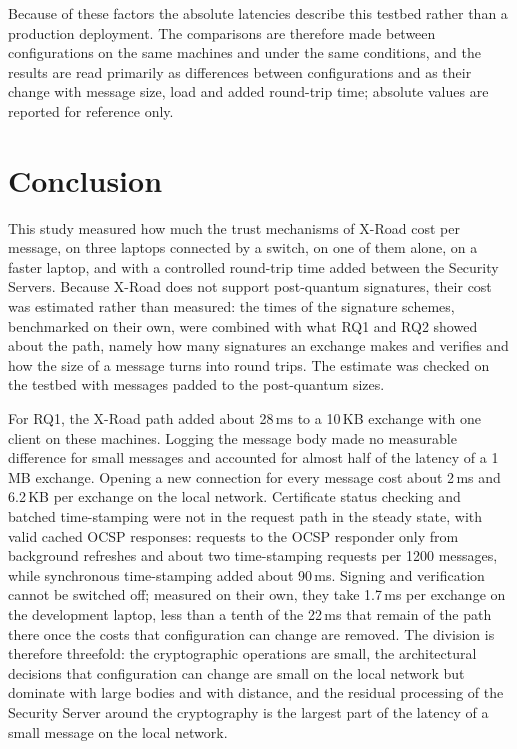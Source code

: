 \documentclass[conference,a4paper]{IEEEtran}
\newcommand{\newtext}[1]{{\color{blue}#1}}
\begin{document}
Because of these factors the absolute latencies describe this testbed rather than a production
deployment. The comparisons are therefore made between configurations on the same machines and
under the same conditions, and the results are read primarily as differences between configurations
and as their change with message size, load and added round-trip time; absolute values are reported for
reference only.

\section{Conclusion}

This study measured how much the trust mechanisms of X-Road cost per message, on three laptops
connected by a switch, on one of them alone, on a faster laptop, and with a controlled round-trip time
added between the Security Servers\newtext{. Because X-Road does not support post-quantum signatures, their cost was
estimated rather than measured: the times of the signature schemes, benchmarked on their own, were
combined with what RQ1 and RQ2 showed about the path, namely how many signatures an exchange makes and
verifies and how the size of a message turns into round trips. The estimate was checked on the testbed
with messages padded to the post-quantum sizes}.

For RQ1, the X-Road path added about 28\,ms to a 10\,KB exchange with one client on these machines.
Logging the message body made no measurable difference for small messages and accounted for almost
half of the latency of a 1\,MB exchange. Opening a new connection for every message cost about 2\,ms
and 6.2\,KB per exchange on the local network. Certificate status checking and batched time-stamping
were not in the request path \newtext{in the steady state, with valid cached OCSP responses}: requests to the OCSP responder only from background refreshes and about two time-stamping
requests per 1200 messages,
while synchronous time-stamping added about 90\,ms. Signing and verification cannot be switched off;
\newtext{measured on their own, they take 1.7\,ms per exchange on the development laptop, less than
a tenth of the 22\,ms that remain of the path there once the costs that configuration can change are
removed. The division is therefore threefold: the cryptographic operations are small, the
architectural decisions that configuration can change are small on the local network but dominate
with large bodies and with distance, and the \newtext{residual processing} of the Security Server around the
cryptography is the largest part of the latency of a small message on the local network.}
\end{document}
